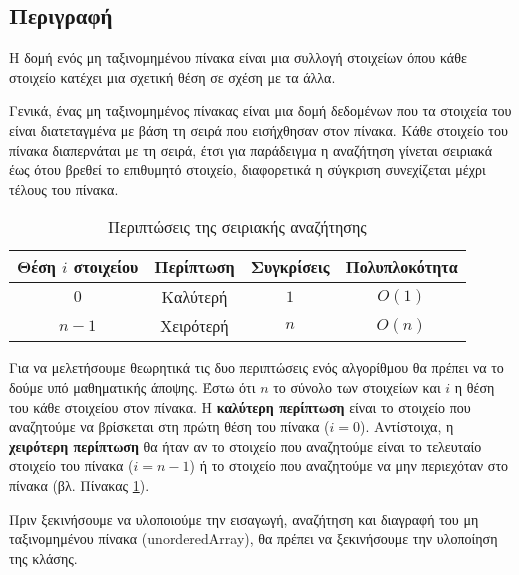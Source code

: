 \subsection*{Περιγραφή}

Η δομή ενός μη ταξινομημένου πίνακα είναι μια συλλογή στοιχείων όπου κάθε στοιχείο κατέχει μια σχετική θέση σε σχέση με τα άλλα.

Γενικά, ένας μη ταξινομημένος πίνακας είναι μια δομή δεδομένων που τα στοιχεία του είναι διατεταγμένα με βάση τη σειρά που εισήχθησαν στον πίνακα. Κάθε στοιχείο του πίνακα διαπερνάται με τη σειρά, έτσι για παράδειγμα η αναζήτηση γίνεται σειριακά έως ότου βρεθεί το επιθυμητό στοιχείο, διαφορετικά η σύγκριση συνεχίζεται μέχρι τέλους του πίνακα.


\begin{table}[h!]
\centering
\begin{tabular}{||c c c c||} 
 \hline
 Θέση $i$ στοιχείου & Περίπτωση & Συγκρίσεις & Πολυπλοκότητα \\
 \hline\hline
 $0$ & Καλύτερή & $1$ & $O(1)$ \\ 
 $n-1$ & Χειρότερή & $n$ & $O(n)$ \\ 
 \hline
\end{tabular}
\caption{Περιπτώσεις της σειριακής αναζήτησης}
\label{table:1}
\end{table}


Για να μελετήσουμε θεωρητικά τις δυο περιπτώσεις ενός αλγορίθμου θα πρέπει να το δούμε υπό μαθηματικής άποψης. Έστω ότι $n$ το σύνολο των στοιχείων και $i$ η θέση του κάθε στοιχείου στον πίνακα. Η \textbf{καλύτερη περίπτωση} είναι το στοιχείο που αναζητούμε να βρίσκεται στη πρώτη θέση του πίνακα ($i=0$). Αντίστοιχα, η \textbf{χειρότερη περίπτωση} θα ήταν αν το στοιχείο που αναζητούμε είναι το τελευταίο στοιχείο του πίνακα ($i=n-1$) ή το στοιχείο που αναζητούμε να μην περιεχόταν στο πίνακα (βλ. Πίνακας \ref{table:1}).

Πριν ξεκινήσουμε να υλοποιούμε την εισαγωγή, αναζήτηση και διαγραφή του μη ταξινομημένου πίνακα \en (unorderedArray), \gr  θα πρέπει να ξεκινήσουμε την υλοποίηση της κλάσης.


